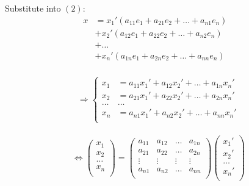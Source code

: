 \begin{itemize}
        \par Substitute into $(2)$:
        \begin{align*}
          x &= x_{1}'(a_{11} e_{1} + a_{21} e_{2} + \ldots + a_{n1} e_{n}) & \\
            &+ x_{2}'(a_{12} e_{1} + a_{22} e_{2} + \ldots + a_{n2} e_{n}) & \\
            &+ \ldots &\\
            &+ x_{n}'(a_{1n} e_{1} + a_{2n} e_{2} + \ldots + a_{nn} e_{n}) &\\
        \end{align*}

        \begin{align*}
          \Rightarrow \left\{
          \begin{aligned}
            x_{1} &= a_{11}x_{1}' + a_{12}x_{2}' + \ldots + a_{1n}x_{n}' \\
            x_{2} &= a_{21}x_{1}' + a_{22}x_{2}' + \ldots + a_{2n}x_{n}' \\
            \ldots & \ldots \\
            x_{n} &= a_{n1}x_{1}' + a_{n2}x_{2}' + \ldots + a_{nn}x_{n}' \\
          \end{aligned}
          \right.
        \end{align*}

        \begin{align*}
          \Leftrightarrow
          \begin{pmatrix}
            x_{1}  \\
            x_{2}  \\
            \ldots \\
            x_{n}  \\
          \end{pmatrix}
          =
          \begin{pmatrix}
            a_{11} & a_{12} & \ldots & a_{1n} \\
            a_{21} & a_{22} & \ldots & a_{2n} \\
            \vdots & \vdots & \vdots & \vdots \\
            a_{n1} & a_{n2} & \ldots & a_{nn} \\
          \end{pmatrix}
          \begin{pmatrix}
            x_{1}' \\
            x_{2}' \\
            \ldots \\
            x_{n}' \\
          \end{pmatrix}
        \end{align*}


\end{itemize}
